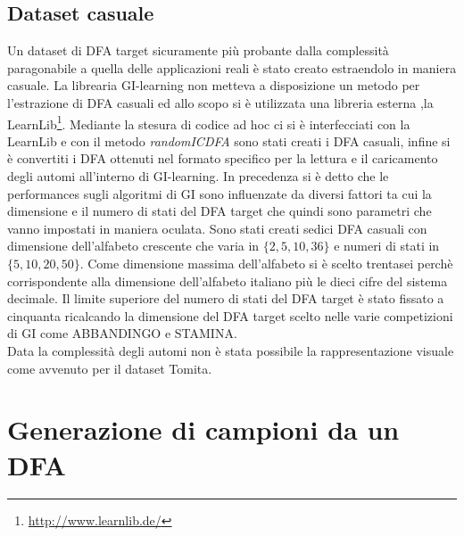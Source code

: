 \subsection{Dataset casuale}
Un dataset di \ac{DFA} target sicuramente più probante dalla complessità paragonabile a quella delle applicazioni reali è stato creato estraendolo in maniera casuale. La librearia GI-learning non metteva a disposizione un metodo per l'estrazione di \ac{DFA} casuali ed allo scopo si è utilizzata una libreria esterna ,la LearnLib\footnote{\href{http://www.learnlib.de/}{http://www.learnlib.de/}}. Mediante la stesura di codice ad hoc ci si è interfecciati con la LearnLib e con il metodo \textit{randomICDFA} sono stati creati i \ac{DFA} casuali, infine si è convertiti i \ac{DFA} ottenuti nel formato specifico per la lettura e il caricamento degli automi all'interno di GI-learning. 
In precedenza si è detto che le performances sugli algoritmi di  \ac{GI} sono influenzate da diversi fattori ta cui la dimensione e il numero di stati del \ac{DFA} target che quindi sono parametri che vanno impostati in maniera oculata.
Sono stati creati sedici \ac{DFA} casuali con dimensione dell'alfabeto crescente che varia in $\{2,5,10,36\}$ e numeri di stati in $\{5,10,20,50\}$. Come dimensione massima dell'alfabeto si è scelto trentasei perchè corrispondente alla dimensione dell'alfabeto italiano più le dieci cifre del sistema decimale. Il limite superiore del numero di stati del \ac{DFA} target è stato fissato a cinquanta ricalcando la dimensione del \ac{DFA} target scelto   nelle varie competizioni di \ac{GI} come ABBANDINGO e STAMINA.\\
Data la complessità degli automi non è stata possibile la rappresentazione visuale come avvenuto per il dataset Tomita.


\section[Gen. campioni da DFA]{Generazione di campioni da un DFA}
\label{sec:gensam}

